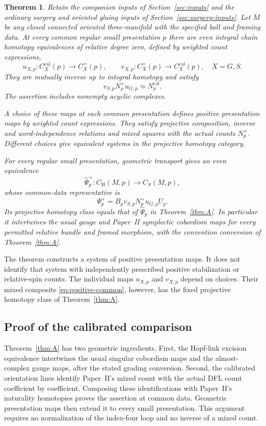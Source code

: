 \documentclass[11pt]{amsart}
\theoremstyle{definition}
\theoremstyle{remark}
\theoremstyle{plain}
\newtheorem{thmletter}{Theorem}
\newcommand{\calib}{\mathrm{cal}}
\newcommand{\CH}{C_{\mathrm H}}
\newcommand{\CS}{C_S}
\begin{document}
\begin{thmletter}\label{thm:B}
Retain the companion inputs of Section~\ref{sec:inputs} and the
ordinary surgery and oriented gluing inputs of
Section~\ref{sec:surgery-inputs}. Let $M$ be any closed connected
oriented three-manifold with the specified ball and framing data.
At every common regular small presentation $p$ there are even
integral chain homotopy equivalences of relative degree zero,
defined by weighted count expressions,
\[
 u_{X,p}:C_X^{\calib}(p)\longrightarrow C_X^+(p),\qquad
 v_{X,p}:C_X^+(p)\longrightarrow C_X^{\calib}(p),\quad X=G,S.
\]
They are mutually inverse up to integral homotopy and satisfy
\begin{equation}\label{eq:positive-square-main}
 v_{S,p}N_p^+u_{G,p}\simeq N_p^{\calib}.
\end{equation}
The assertion includes nonempty acyclic complexes.

A choice of these maps at each common presentation defines
positive presentation maps by weighted count expressions. They
satisfy projective composition, inverse and word-independence
relations and mixed squares with the actual counts $N_p^+$.
Different choices give equivalent systems in the projective
homotopy category.

For every regular small presentation, geometric transport gives
an even equivalence
\[
 \widehat\Psi_p^+:\CH(M,p)\longrightarrow\CS(M,p),
\]
whose common-data representative is
\begin{equation}\label{eq:positive-common}
 \Psi_p^+=B_pv_{S,p}N_p^+u_{G,p}U_p.
\end{equation}
Its projective homotopy class equals that of $\widehat\Psi_p$ in
Theorem~\ref{thm:A}. In particular it intertwines the usual gauge
and Paper~II symplectic cobordism maps for every permitted relative
bundle and framed morphism, with the convention conversion of
Theorem~\ref{thm:A}.
\end{thmletter}

The theorem constructs a system of positive presentation maps.
It does not identify that system with independently prescribed
positive stabilization or relative-spin counts. The individual
maps $u_{X,p}$ and $v_{X,p}$ depend on choices. Their mixed composite
\eqref{eq:positive-common}, however, has the fixed projective
homotopy class of Theorem~\ref{thm:A}.

\subsection{Proof of the calibrated comparison}
Theorem~\ref{thm:A} has two geometric ingredients. First, the
Hopf-link excision equivalence intertwines the usual singular
cobordism maps and the almost-complex gauge maps, after the stated
grading conversion. Second, the calibrated orientation lines
identify Paper~II's mixed count with the actual DFL count
coefficient by coefficient. Composing these identifications with
Paper~II's naturality homotopies proves the assertion at common
data. Geometric presentation maps then extend it to every small
presentation. This argument requires no normalization of the
index-four loop and no inverse of a mixed count.
\end{document}
